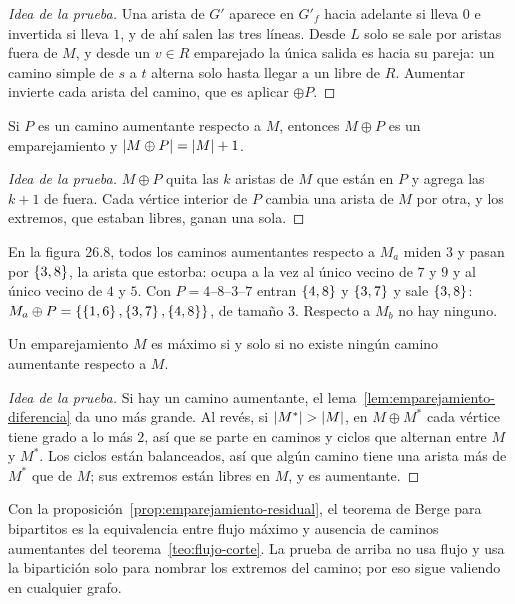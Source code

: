 \documentclass[11pt,letterpaper]{article}
\begin{document}
\begin{proof}[Idea de la prueba]
  Una arista de $G'$ aparece en $G'_f$ hacia adelante si lleva $0$ e
  invertida si lleva $1$, y de ahí salen las tres líneas. Desde $L$
  solo se sale por aristas fuera de $M$, y desde un $v \in R$
  emparejado la única salida es hacia su pareja: un camino simple de
  $s$ a $t$ alterna solo hasta llegar a un libre de $R$. Aumentar
  invierte cada arista del camino, que es aplicar $\oplus P$.
\end{proof}

\begin{lema}
  \label{lem:emparejamiento-diferencia}
  Si $P$ es un camino aumentante respecto a $M$, entonces
  $M \oplus P$ es un emparejamiento y
  $\left\lvert M \oplus P \right\rvert = \left\lvert M \right\rvert + 1$.
\end{lema}

\begin{proof}[Idea de la prueba]
  $M \oplus P$ quita las $k$ aristas de $M$ que están en $P$ y agrega
  las $k + 1$ de fuera. Cada vértice interior de $P$ cambia una arista
  de $M$ por otra, y los extremos, que estaban libres, ganan una sola.
\end{proof}

En la figura 26.8, todos los caminos aumentantes respecto a $M_a$
miden $3$ y pasan por $\left\{ 3,8 \right\}$, la arista que estorba: ocupa a la
vez al único vecino de $7$ y $9$ y al único vecino de $4$ y $5$. Con
$P = 4$--$8$--$3$--$7$ entran $\left\{ 4,8 \right\}$ y $\left\{ 3,7 \right\}$ y sale
$\left\{ 3,8 \right\}$: $M_a \oplus P = \left\{ \left\{ 1,6 \right\}, \left\{ 3,7 \right\}, \left\{ 4,8 \right\} \right\}$,
de tamaño $3$. Respecto a $M_b$ no hay ninguno.

\begin{teorema}[Berge]
  \label{teo:emparejamiento-berge}
  Un emparejamiento $M$ es máximo si y solo si no existe ningún
  camino aumentante respecto a $M$.
\end{teorema}

\begin{proof}[Idea de la prueba]
  Si hay un camino aumentante, el
  lema~\ref{lem:emparejamiento-diferencia} da uno más grande. Al
  revés, si $\left\lvert M^* \right\rvert > \left\lvert M \right\rvert$, en $M \oplus M^*$ cada vértice
  tiene grado a lo más $2$, así que se parte en caminos y ciclos que
  alternan entre $M$ y $M^*$. Los ciclos están balanceados, así que
  algún camino tiene una arista más de $M^*$ que de $M$; sus extremos
  están libres en $M$, y es aumentante.
\end{proof}

Con la proposición~\ref{prop:emparejamiento-residual}, el teorema de
Berge para bipartitos es la equivalencia entre flujo máximo y
ausencia de caminos aumentantes del teorema~\ref{teo:flujo-corte}. La
prueba de arriba no usa flujo y usa la bipartición solo para nombrar
los extremos del camino; por eso sigue valiendo en cualquier grafo.
\end{document}
